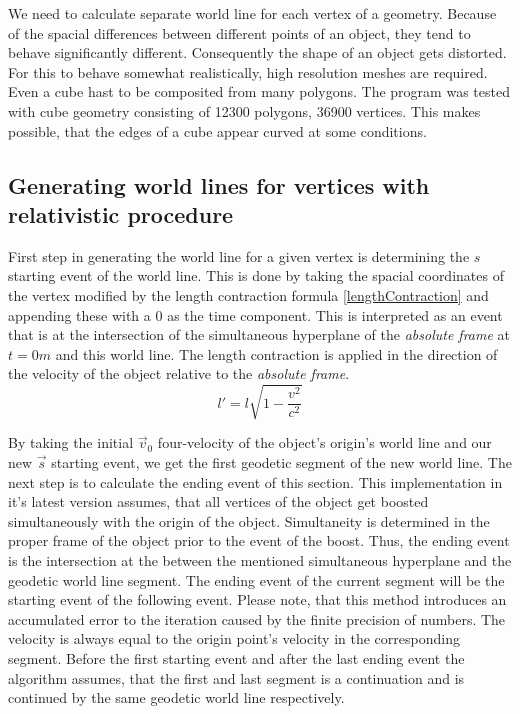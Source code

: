 \documentclass{egpubl}
\begin{document}
We need to calculate separate world line for each vertex of a geometry. Because of the spacial differences between different points of an object, they tend to behave significantly different. Consequently the shape of an object gets distorted. For this to behave somewhat realistically, high resolution meshes are required. Even a cube hast to be composited from many polygons. The program was tested with cube geometry consisting of 12300 polygons, 36900 vertices. This makes possible, that the edges of a cube appear curved at some conditions.

\subsection{Generating world lines for vertices with relativistic procedure}
\label{genRelProc}
First step in generating the world line for a given vertex is determining the $s$ starting event of the world line. This is done by taking the spacial coordinates of the vertex modified by the length contraction formula \ref{lengthContraction} and appending these with a $0$ as the time component. This is interpreted as an event that is at the intersection of the simultaneous hyperplane of the \emph{absolute frame} at $t = 0 m$ and this world line. The length contraction is applied in the direction of the velocity of the object relative to the \emph{absolute frame}.
\begin{equation}
\label{lengthContraction}
l' =l\sqrt{1 - \frac{v^2}{c^2}}
\end{equation}

By taking the initial $\vec{v}_0$ four-velocity of the object's origin's world line and our new $\vec{s}$ starting event, we get the first geodetic segment of the new world line. The next step is to calculate the ending event of this section. This implementation in it's latest version assumes, that all vertices of the object get boosted simultaneously with the origin of the object. Simultaneity is determined in the proper frame of the object prior to the event of the boost. Thus, the ending event is the intersection at the between the mentioned simultaneous hyperplane and the geodetic world line segment. The ending event of the current segment will be the starting event of the following event. Please note, that this method introduces an accumulated error to the iteration caused by the finite precision of numbers. The velocity is always equal to the origin point's velocity in the corresponding segment. Before the first starting event and after the last ending event the algorithm assumes, that the first  and last segment is a continuation and is continued by the same geodetic world line respectively.
\end{document}
